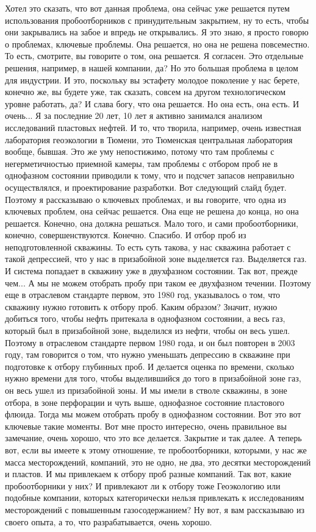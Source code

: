 \documentclass[main.tex]{subfiles}
\begin{document}
Хотел это сказать, что вот данная проблема, она сейчас уже решается путем использования пробоотборников с принудительным закрытием, ну то есть, чтобы они закрывались на забое и впредь не открывались.
Я это знаю, я просто говорю о проблемах, ключевые проблемы.
Она решается, но она не решена повсеместно.
То есть, смотрите, вы говорите о том, она решается.
Я согласен.
Это отдельные решения, например, в нашей компании, да?
Но это большая проблема в целом для индустрии.
И это, поскольку вы эстафету молодое поколение у нас берете, конечно же, вы будете уже, так сказать, совсем на другом технологическом уровне работать, да?
И слава богу, что она решается.
Но она есть, она есть.
И очень...
Я за последние 20 лет, 10 лет я активно занимался анализом исследований пластовых нефтей.
И то, что творила, например, очень известная лаборатория геоэкологии в Тюмени, это Тюменская центральная лаборатория вообще, бывшая.
Это же уму непостижимо, потому что там проблемы с негерметичностью приемной камеры, там проблемы с отбором проб не в однофазном состоянии приводили к тому, что и подсчет запасов неправильно осуществлялся, и проектирование разработки.
Вот следующий слайд будет.
Поэтому я рассказываю о ключевых проблемах, и вы говорите, что одна из ключевых проблем, она сейчас решается.
Она еще не решена до конца, но она решается.
Конечно, она должна решаться.
Мало того, и сами пробоотборники, конечно, совершенствуются.
Конечно.
Спасибо.
И отбор проб из неподготовленной скважины.
То есть суть такова, у нас скважина работает с такой депрессией, что у нас в призабойной зоне выделяется газ.
Выделяется газ.
И система попадает в скважину уже в двухфазном состоянии.
Так вот, прежде чем... А мы не можем отобрать пробу при таком ее двухфазном течении.
Поэтому еще в отраслевом стандарте первом, это 1980 год, указывалось о том, что скважину нужно готовить к отбору проб.
Каким образом?
Значит, нужно добиться того, чтобы нефть притекала в однофазном состоянии, а весь газ, который был в призабойной зоне, выделился из нефти, чтобы он весь ушел.
Поэтому в отраслевом стандарте первом 1980 года, и он был повторен в 2003 году, там говорится о том, что нужно уменьшать депрессию в скважине при подготовке к отбору глубинных проб.
И делается оценка по времени, сколько нужно времени для того, чтобы выделившийся до того в призабойной зоне газ, он весь ушел из призабойной зоны.
И мы имели в стволе скважины, в зоне отбора, в зоне перфорации и чуть выше, однофазное состояние пластового флюида.
Тогда мы можем отобрать пробу в однофазном состоянии.
Вот это вот ключевые такие моменты.
Вот мне просто интересно, очень правильное вы замечание, очень хорошо, что это все делается.
Закрытие и так далее.
А теперь вот, если вы имеете к этому отношение, те пробоотборники, которыми, у нас же масса месторождений, компаний, это не одно, не два, это десятки месторождений и пластов.
И мы привлекаем к отбору проб разные компаний.
Так вот, какие пробоотборники у них?
И привлекают ли к отбору тоже Геоэкологию или подобные компании, которых категорически нельзя привлекать к исследованиям месторождений с повышенным газосодержанием?
Ну вот, я вам рассказываю из своего опыта, а то, что разрабатывается, очень хорошо.
\end{document}
